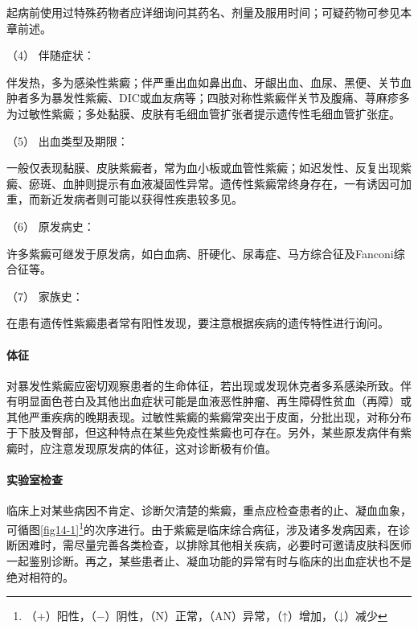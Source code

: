 起病前使用过特殊药物者应详细询问其药名、剂量及服用时间；可疑药物可参见本章前述。

\hypertarget{text00036.htmlux5cux23CHP1-14-2-1-4}{}
（4） 伴随症状：

伴发热，多为感染性紫癜；伴严重出血如鼻出血、牙龈出血、血尿、黑便、关节血肿者多为暴发性紫癜、DIC或血友病等；四肢对称性紫癜伴关节及腹痛、荨麻疹多为过敏性紫癜；多处黏膜、皮肤有毛细血管扩张者提示遗传性毛细血管扩张症。

\hypertarget{text00036.htmlux5cux23CHP1-14-2-1-5}{}
（5） 出血类型及期限：

一般仅表现黏膜、皮肤紫癜者，常为血小板或血管性紫癜；如迟发性、反复出现紫癜、瘀斑、血肿则提示有血液凝固性异常。遗传性紫癜常终身存在，一有诱因可加重，而新近发病者则可能以获得性疾患较多见。

\hypertarget{text00036.htmlux5cux23CHP1-14-2-1-6}{}
（6） 原发病史：

许多紫癜可继发于原发病，如白血病、肝硬化、尿毒症、马方综合征及Fanconi综合征等。

\hypertarget{text00036.htmlux5cux23CHP1-14-2-1-7}{}
（7） 家族史：

在患有遗传性紫癜患者常有阳性发现，要注意根据疾病的遗传特性进行询问。

\paragraph{体征}

对暴发性紫癜应密切观察患者的生命体征，若出现或发现休克者多系感染所致。伴有明显面色苍白及其他出血症状可能是血液恶性肿瘤、再生障碍性贫血（再障）或其他严重疾病的晚期表现。过敏性紫癜的紫癜常突出于皮面，分批出现，对称分布于下肢及臀部，但这种特点在某些免疫性紫癜也可存在。另外，某些原发病伴有紫癜时，应注意发现原发病的体征，这对诊断极有价值。

\paragraph{实验室检查}

临床上对某些病因不肯定、诊断欠清楚的紫癜，重点应检查患者的止、凝血血象，可循图\ref{fig14-1}\footnote{（+）阳性，（−）阴性，（N）正常，（AN）异常，（↑）增加，（↓）减少}的次序进行。由于紫癜是临床综合病征，涉及诸多发病因素，在诊断困难时，需尽量完善各类检查，以排除其他相关疾病，必要时可邀请皮肤科医师一起鉴别诊断。再之，某些患者止、凝血功能的异常有时与临床的出血症状也不是绝对相符的。

